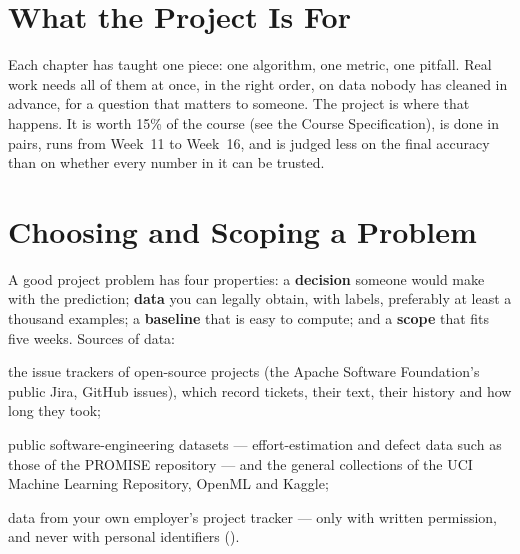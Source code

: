\section{What the Project Is For}

Each chapter has taught one piece: one algorithm, one metric, one pitfall. Real work
needs all of them at once, in the right order, on data nobody has cleaned in advance,
for a question that matters to someone. The project is where that happens. It is
worth 15\% of the course (see the Course Specification), is done in pairs, runs from
Week~11 to Week~16, and is judged less on the final accuracy than on whether every
number in it can be trusted.

\section{Choosing and Scoping a Problem}

A good project problem has four properties: a \textbf{decision} someone would make
with the prediction; \textbf{data} you can legally obtain, with labels, preferably at
least a thousand examples; a \textbf{baseline} that is easy to compute; and a
\textbf{scope} that fits five weeks. Sources of data:
\begin{tight}
  \item the issue trackers of open-source projects (the Apache Software Foundation's
        public Jira, GitHub issues), which record tickets, their text, their history
        and how long they took;
  \item public software-engineering datasets --- effort-estimation and defect data
        such as those of the PROMISE repository --- and the general collections of the
        UCI Machine Learning Repository, OpenML and Kaggle;
  \item data from your own employer's project tracker --- only with written
        permission, and never with personal identifiers ().
\end{tight}

